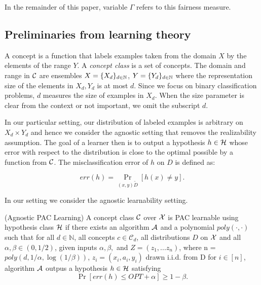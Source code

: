 In the remainder of this paper, variable $\Gamma$ refers to this
fairness measure.


\subsection{Preliminaries from learning theory}
A concept is a function that labels examples taken from the domain $X$
by the elements of the range $Y$. A \emph{concept class} is a set of
concepts. The domain and range in $\mathcal{C}$ are ensembles $X= \{X_d\}_{d\in
\mathbb{N}}$, $Y= \{Y_d\}_{d\in \mathbb{N}}$ where the representation size of the
elements in $X_d,Y_d$ is at most $d$. Since we focus on binary
classification problems, $d$ measures the size of examples in $X_d$.
When the size parameter is clear from the context or not important, we
omit the subscript $d$.

In our particular setting, our distribution of labeled examples is
arbitrary on $X_d \times Y_d$ and hence we consider the agnostic
setting that removes the realizability assumption. The goal of a
learner then is to output a hypothesis $h \in \mathcal{H}$ whose error with
respect to the distribution is close to the optimal possible by a
function from $\mathcal{C}$. The misclassification error of $h$ on $D$ is
defined as:

$$err(h) = \Pr_{(x,y) \tilde D}[h(x) \neq y].$$

In our setting we consider the agnostic learnability setting.
\begin{defn}
	(Agnostic PAC Learning) A concept class $\mathcal{C}$ over $\mathcal{X}$ is PAC
  learnable using hypothesis class $\mathcal{H}$ if there exists an algorithm
  $\mathcal{A}$ and a polynomial $poly(\cdot,\cdot)$ such that for all $d \in
  \mathbb{N}$, all concepts $c \in \mathcal{C}_d$, all distributions
  $D$ on $\mathcal{X}$ and all $\alpha,\beta \in (0,1/2)$, given inputs
  $\alpha,\beta,$ and $Z = (z_1, ... z_n)$, where n = $poly(d,
  1/\alpha, \log(1/\beta))$, $z_i = (x_i, a_i, y_i)$ drawn i.i.d. from
  D for $i \in [n]$, algorithm $\mathcal{A}$ outpus a hypothesis $h \in \mathcal{H}$
  satisfying
	$$\Pr[err(h) \leq OPT + \alpha] \geq 1-\beta.$$

\end{defn}
